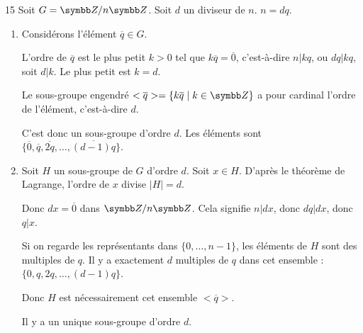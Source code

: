 \begin{correction}{15}
Soit $G = \Z/n\Z$. Soit $d$ un diviseur de $n$. $n=dq$.
\begin{enumerate}
    \item Considérons l'élément $\overline{q} \in G$.
    
        L'ordre de $\overline{q}$ est le plus petit $k > 0$ tel que $k\overline{q} = \overline{0}$,
        c'est-à-dire $n | kq$, ou $dq | kq$, soit $d | k$.
        Le plus petit est $k=d$.

        Le sous-groupe engendré $<\overline{q}> = \{ k\overline{q} \mid k \in \Z \}$ 
        a pour cardinal l'ordre de l'élément, c'est-à-dire $d$.

        C'est donc un sous-groupe d'ordre $d$.
        Les éléments sont $\{\overline{0}, \overline{q}, \overline{2q}, \dots, \overline{(d-1)q}\}$.
        
    \item Soit $H$ un sous-groupe de $G$ d'ordre $d$.
        Soit $x \in H$. D'après le théorème de Lagrange, l'ordre de $x$ divise $|H|=d$.

        Donc $d x = \overline{0}$ dans $\Z/n\Z$.
        Cela signifie $n | dx$, donc $dq | dx$, donc $q | x$.

        Si on regarde les représentants dans $\{0, \dots, n-1\}$, les éléments de $H$ sont des multiples de $q$.
        Il y a exactement $d$ multiples de $q$ dans cet ensemble : $\{0, q, 2q, \dots, (d-1)q\}$.

        Donc $H$ est nécessairement cet ensemble $<\overline{q}>$.

        Il y a un unique sous-groupe d'ordre $d$.
\end{enumerate}
\end{correction}
